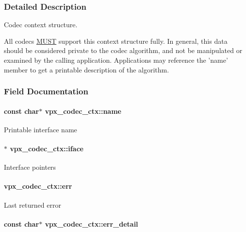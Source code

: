 \subsubsection{\-Detailed \-Description}
\-Codec context structure. 

\-All codecs \hyperlink{rfc2119_MUST}{\-M\-U\-S\-T} support this context structure fully. \-In general, this data should be considered private to the codec algorithm, and not be manipulated or examined by the calling application. \-Applications may reference the 'name' member to get a printable description of the algorithm. 

\subsubsection{\-Field \-Documentation}
\hypertarget{structvpx__codec__ctx_a7ed1bf8f6434ea2df01da8011849c6cb}{
\paragraph[{name}]{\setlength{\rightskip}{0pt plus 5cm}const char$\ast$ {\bf vpx\-\_\-codec\-\_\-ctx\-::name}}}\label{structvpx__codec__ctx_a7ed1bf8f6434ea2df01da8011849c6cb}
\-Printable interface name \hypertarget{structvpx__codec__ctx_af5986790e3420beda77f3a9b64f6b953}{
\paragraph[{iface}]{$\ast$ {\bf vpx\-\_\-codec\-\_\-ctx\-::iface}}}\label{structvpx__codec__ctx_af5986790e3420beda77f3a9b64f6b953}
\-Interface pointers \hypertarget{structvpx__codec__ctx_a6f448802b0675013fd8c5179675c30de}{
\paragraph[{err}]{ {\bf vpx\-\_\-codec\-\_\-ctx\-::err}}}\label{structvpx__codec__ctx_a6f448802b0675013fd8c5179675c30de}
\-Last returned error \hypertarget{structvpx__codec__ctx_ad785c88ae862dd9129965c72723260bd}{
\paragraph[{err\-\_\-detail}]{\setlength{\rightskip}{0pt plus 5cm}const char$\ast$ {\bf vpx\-\_\-codec\-\_\-ctx\-::err\-\_\-detail}}}\label{structvpx__codec__ctx_ad785c88ae862dd9129965c72723260bd}
